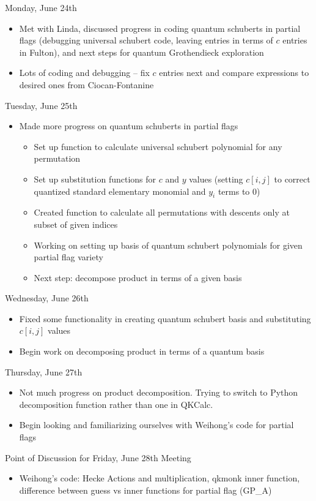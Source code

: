 Monday, June 24th
\begin{itemize}
    \item Met with Linda, discussed progress in coding quantum schuberts in partial flags (debugging universal schubert code, leaving entries in terms of $c$ entries in Fulton), and next steps for quantum Grothendieck exploration
    \item Lots of coding and debugging -- fix $c$ entries next and compare expressions to desired ones from Ciocan-Fontanine
\end{itemize}

Tuesday, June 25th
\begin{itemize}
    \item Made more progress on quantum schuberts in partial flags
    \begin{itemize}
        \item Set up function to calculate universal schubert polynomial for any permutation
        \item Set up substitution functions for $c$ and $y$ values (setting $c[i, j]$ to correct quantized standard elementary monomial and $y_i$ terms to $0$)
        \item Created function to calculate all permutations with descents only at subset of given indices
        \item Working on setting up basis of quantum schubert polynomials for given partial flag variety
        \item Next step: decompose product in terms of a given basis
    \end{itemize}
\end{itemize}

Wednesday, June 26th
\begin{itemize}
    \item Fixed some functionality in creating quantum schubert basis and substituting $c[i, j]$ values
    \item Begin work on decomposing product in terms of a quantum basis
\end{itemize}

Thursday, June 27th
\begin{itemize}
    \item Not much progress on product decomposition. Trying to switch to Python decomposition function rather than one in QKCalc.
    \item Begin looking and familiarizing ourselves with Weihong's code for partial flags
\end{itemize}


Point of Discussion for Friday, June 28th Meeting
\begin{itemize}
    \item Weihong's code: Hecke Actions and multiplication, qkmonk inner function, difference between guess vs inner functions for partial flag (GP\_A)
\end{itemize}